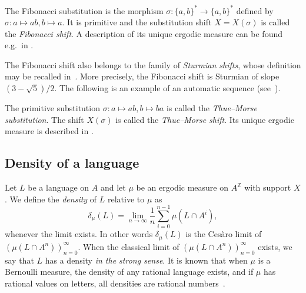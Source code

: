 \documentclass[a4paper,UKenglish,numberwithinsect,cleveref]{lipics-v2021}
\newcommand{\Z}{\mathbb{Z}}
\begin{document}
\begin{example}\label{exampleFibonacci}
    The Fibonacci substitution is the morphism $\sigma\colon \{a,b\}^*\to \{a,b\}^*$ defined by $\sigma\colon a\mapsto ab,b\mapsto a$. It is primitive and the substitution shift $X=X(\sigma)$ is called the \emph{Fibonacci shift}. A description of its unique ergodic measure can be found e.g.\ in \cite[Example~3.8.19]{DurandPerrin2021}.
\end{example}

The Fibonacci shift also belongs to the family of \emph{Sturmian shifts}, whose definition may be recalled in~\cite{Lothaire1983}. More precisely, the Fibonacci shift is Sturmian of slope $(3-\sqrt{5})/2$. The following is an example of an automatic sequence (see~\cite{book/Allouche2003}).

\begin{example}\label{exampleMorse}
    The primitive substitution $\sigma\colon a\mapsto ab,b\mapsto ba$ is called the \emph{Thue--Morse substitution}. The shift $X(\sigma)$ is called the \emph{Thue--Morse shift}. Its unique ergodic measure is described in \cite[Example 3.8.20]{DurandPerrin2021}.
\end{example}

\subsection{Density of a language}

Let $L$ be a  language on $A$ and let $\mu$ be an ergodic measure on $A^\Z$ with support $X$. We define the \emph{density} of $L$ relative to $\mu$ as
\begin{displaymath}
    \delta_\mu(L)=\lim_{n\to\infty}\frac{1}{n}\sum_{i=0}^{n-1}\mu(L\cap A^i),
\end{displaymath}
whenever the limit exists. In other words $\delta_\mu(L)$ is the Cesàro limit of $(\mu(L\cap A^n))_{n=0}^\infty$. When the classical limit of $(\mu(L\cap A^n))_{n=0}^\infty$ exists, we say that $L$ has a density \emph{in the strong sense}. It is known that when $\mu$ is a Bernoulli measure, the density of any rational language exists, and if $\mu$ has rational values on letters, all densities are rational numbers~\cite[Theorem~2.1]{Berstel1972}.
\end{document}
